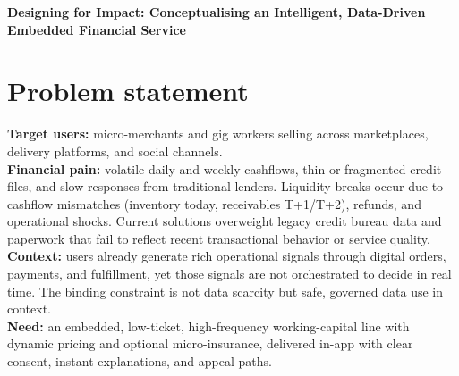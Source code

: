 \documentclass[11pt,a4paper]{article}
\begin{document}
\vspace*{-5em}
\begin{center}
  \LARGE{\textbf{Designing for Impact: Conceptualising an Intelligent, Data-Driven Embedded Financial Service}}
\end{center}
\normalsize

\section*{Problem statement}
\textbf{Target users:} micro-merchants and gig workers selling across marketplaces, delivery platforms, and social channels.\\
\textbf{Financial pain:} volatile daily and weekly cashflows, thin or fragmented credit files, and slow responses from traditional lenders. Liquidity breaks occur due to cashflow mismatches (inventory today, receivables T{+}1/T{+}2), refunds, and operational shocks. Current solutions overweight legacy credit bureau data and paperwork that fail to reflect recent transactional behavior or service quality.\\
\textbf{Context:} users already generate rich operational signals through digital orders, payments, and fulfillment, yet those signals are not orchestrated to decide in real time. The binding constraint is not data scarcity but safe, governed data use in context.\\
\textbf{Need:} an embedded, low-ticket, high-frequency working-capital line with dynamic pricing and optional micro-insurance, delivered in-app with clear consent, instant explanations, and appeal paths.
\end{document}
